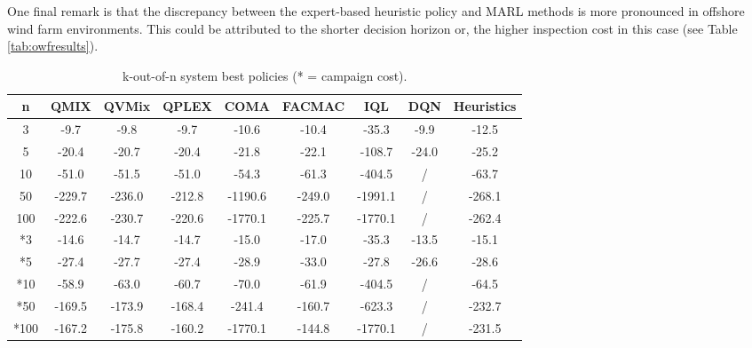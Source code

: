 One final remark is that the discrepancy between the expert-based heuristic policy and MARL methods is more pronounced in offshore wind farm environments. 
This could be attributed to the shorter decision horizon or, the higher inspection cost in this case (see Table \ref{tab:owfresults}).

\newpage
\begin{table}
\centering
\setlength\tabcolsep{4.5pt}
\begin{tabular}{c|ccccccc|c}
\toprule
n & QMIX & QVMix & QPLEX & COMA & FACMAC & IQL & DQN & Heuristics \\
\midrule
3 & -9.7 & -9.8 & -9.7 & -10.6 & -10.4 & -35.3 & -9.9 & -12.5 \\
5 & -20.4 & -20.7 & -20.4 & -21.8 & -22.1 & -108.7 & -24.0 & -25.2 \\
10 & -51.0 & -51.5 & -51.0 & -54.3 & -61.3 & -404.5 & / & -63.7 \\
50 & -229.7 & -236.0 & -212.8 & -1190.6 & -249.0 & -1991.1 & / & -268.1 \\
100 & -222.6 & -230.7 & -220.6 & -1770.1 & -225.7 & -1770.1 & / & -262.4 \\
\midrule
*3 & -14.6 & -14.7 & -14.7 & -15.0 & -17.0 & -35.3 & -13.5 & -15.1 \\
*5 & -27.4 & -27.7 & -27.4 & -28.9 & -33.0 & -27.8 & -26.6 & -28.6 \\
*10 & -58.9 & -63.0 & -60.7 & -70.0 & -61.9 & -404.5 & / & -64.5 \\
*50 & -169.5 & -173.9 & -168.4 & -241.4 & -160.7 & -623.3 & / & -232.7 \\
*100 & -167.2 & -175.8 & -160.2 & -1770.1 & -144.8 & -1770.1 & / & -231.5 \\
\bottomrule
\end{tabular}
\caption{k-out-of-n system best policies (* = campaign cost).}
\label{tab:koutofnresults}
\end{table}

